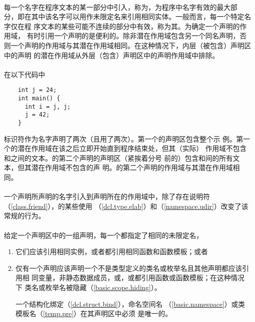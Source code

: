 \paragraph{} %
每一个名字在程序文本的某一部分中引入，称为，为程序中名字有效的最大部
分，即在其中该名字可以用作未限定名来引用相同实体。一般而言，每一个特定名字仅在程
序文本的某些可能不连续的部分中有效，称为其。为确定一个声明的作用域，
有时引用一个声明的是便利的。除非潜在作用域包含另一个同名声明，否
则一个声明的作用域与其潜在作用域相同。在这种情况下，内层（被包含）声明区中的声明
的潜在作用域从外层（包含）声明区中的声明作用域中排除。

\paragraph{} %
\begin{example}
  在以下代码中
  \begin{lstlisting}
    int j = 24;
    int main() {
      int i = j, j;
      j = 42;
    }
  \end{lstlisting}
  标识符作为名字声明了两次（且用了两次）。第一个的声明区包含整个示
  例。第一个的潜在作用域在该之后立即开始直到程序结束处，但其（实际）
  作用域不包含\tm{,}和\tm{\}}之间的文本。的第二个声明的声明区（紧挨着分号
  前的）包含\tm{\{}和\tm{\}}间的所有文本，但其潜在作用域不包含的声
  明。的第二个声明的作用域与其潜在作用域相同。
\end{example}

\paragraph{} %
\begin{sloppypar}
  一个声明所声明的名字引入到声明所在的作用域中，除了存在说明符
  （\ref{class.friend}），的某些使用
  （\ref{dcl.type.elab}）和（\ref{namespace.udir}）改变了该
  常规的行为。
\end{sloppypar}

\paragraph{} %
给定一个声明区中的一组声明，每一个都指定了相同的未限定名，
\begin{enumerate}
  \item 它们应该引用相同实例，或者都引用相同函数和函数模板；或者
  \item 仅有一个声明应该声明一个不是类型定义的类名或枚举名且其他声明都应该引用相
        同变量，非静态数据成员，或\enumr{}，或都引用函数或函数模板；在这种情况下
        类名或枚举名被隐藏（\ref{basic.scope.hiding}）。

        \begin{note} %
          一个结构化绑定（\ref{dcl.struct.bind}），命名空间名
          （\ref{basic.namespace}）或类模板名（\ref{temp.pre}）在其声明区中必须
          是唯一的。
        \end{note}
\end{enumerate}

